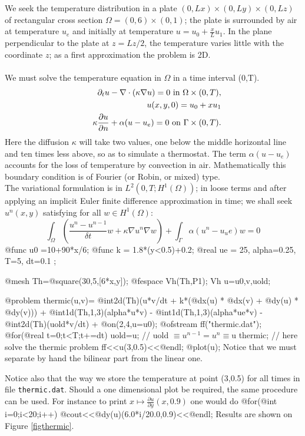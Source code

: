 \documentclass[a4paper,twoside,12pt]{book}
\def\x#1{#1\index{#1}}%
\def\p{\partial}
\def\n{\nabla}
\begin{document}
We seek the temperature distribution in a plate $(0,Lx)\times(0,Ly)\times(0,Lz)$
of rectangular cross section $\Omega=(0,6)\times(0,1)$; the plate is
surrounded by air at temperature $u_e$ and
initially at temperature $u=u_0+\frac x L u_1$. In the plane perpendicular to the plate
at $z=Lz/2$,  the temperature varies little with
the coordinate $z$; as a first approximation the problem is 2D.
\\\\
We must solve the temperature equation in $\Omega$ in a time interval (0,T).
\begin{eqnarray}&&
    \p_t u -\n\cdot(\kappa\n u)=0 \hbox{ in } \Omega\times(0,T),
    \cr&&
    u(x,y,0)=u_0+x u_1
    \cr&&
    \kappa\frac{\p u}{\p n} +\alpha(u-u_e)=0\hbox{ on } \Gamma\times(0,T).
\end{eqnarray}
Here the diffusion $\kappa$ will take two values, one below the middle horizontal line and ten times less
above, so as to simulate a thermostat.
The term $\alpha(u-u_e)$ accounts for the loss of temperature by convection in air.  Mathematically
this boundary condition is of \x{Fourier} (or \x{Robin}, or \x{mixed}) type.
\\
The variational formulation is  in $L^2(0,T;H^1(\Omega))$; in loose terms and after applying an implicit Euler
finite difference approximation in time; we shall seek $u^n(x,y)$ satisfying for all $w\in H^1(\Omega)$:
\[
    \int_\Omega(\frac{u^n-u^{n-1}}{\delta t} w + \kappa\n u^n\n w) +\int_\Gamma\alpha(u^n-u_ue)w=0
\]
\bFF
@func u0 =10+90*x/6;
@func k = 1.8*(y<0.5)+0.2;
@real ue = 25, alpha=0.25, T=5, dt=0.1 ;

@mesh Th=@square(30,5,[6*x,y]);
@fespace Vh(Th,P1);
Vh u=u0,v,uold;

@problem thermic(u,v)= @int2d(Th)(u*v/dt + k*(@dx(u) * @dx(v) + @dy(u) * @dy(v)))
                + @int1d(Th,1,3)(alpha*u*v)
                - @int1d(Th,1,3)(alpha*ue*v)
                - @int2d(Th)(uold*v/dt) + @on(2,4,u=u0);
@ofstream ff("thermic.dat");
@for(@real t=0;t<T;t+=dt){
    uold=u;    // uold $\equiv  u^{n-1} = u^n \equiv $u \hfilll
    thermic;  // here solve the thermic problem \hfilll
    ff<<u(3,0.5)<<@endl;
    @plot(u);
}
\eFF
Notice that we must separate by hand the bilinear part from the linear one.

Notice also that  the way we store the temperature at point (3,0.5) for all times in file {\tt thermic.dat}.
Should a one dimensional plot be required, the same procedure can be used.  For instance to
print $x\mapsto \frac{\p u}{\p y}(x,0.9)$ one would do
\bFF
@for(@int i=0;i<20;i++) @cout<<@dy(u)(6.0*i/20.0,0.9)<<@endl;
\eFF
Results are shown on Figure \ref{figthermic}.
\end{document}

